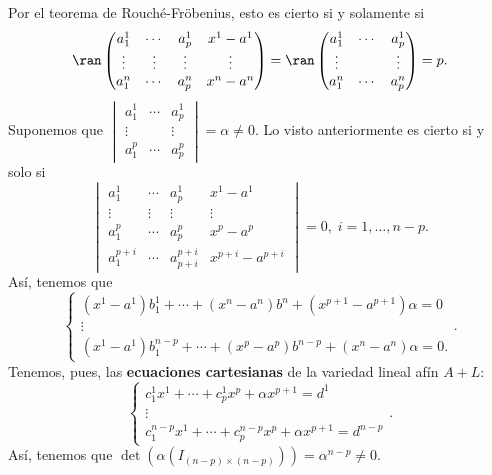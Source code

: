 Por el teorema de Rouché-Fröbenius, esto es cierto si y solamente si
\[ \ran\begin{pmatrix} a^{1}_{1} & \cdots & a^{1}_{p} & x^{1}-a^{1} \\
\vdots & \vdots & \vdots & \vdots \\
a^{n}_{1} & \cdots & a^{n}_{p} & x^{n}-a^{n}\end{pmatrix} = \ran\begin{pmatrix} a^{1}_{1} & \cdots & a^{1}_{p} \\
\vdots & & \vdots \\
a^{n}_{1} & \cdots & a^{n}_{p}\end{pmatrix} = p.\]
	Suponemos que $\displaystyle \begin{vmatrix} a^{1}_{1} & \cdots & a^{1}_{p} \\
	\vdots & & \vdots \\
a^{p}_{1} & \cdots & a^{p}_{p}\end{vmatrix} = \alpha \neq 0 $. Lo visto anteriormente es cierto si y solo si 
		\[ \begin{vmatrix} a^{1}_{1} & \cdots & a^{1}_{p} & x^{1}-a^{1} \\
		\vdots & \vdots & \vdots & \vdots \\
	a^{p}_{1} & \cdots & a^{p}_{p} & x^{p}-a^{p} \\
a^{p + i}_{1} & \cdots & a^{ p + i}_{ p + i} & x^{ p + i}- a^{p + i}\end{vmatrix}  = 0 , \; i = 1, \ldots, n - p.\]
Así, tenemos que 
\[
\begin{cases}
 \left(x^{1}-a^{1}\right)b^{1}_{1} + \cdots + \left(x^{n}-a^{n}\right)b^{n} +\left(x^{p + 1}-a^{p + 1}\right)\alpha = 0 \\
 \vdots \\
 \left(x^{1}-a^{1}\right)b^{n-p}_{1} + \cdots + \left(x^{p}-a^{p}\right)b^{n-p} + \left(x^{n}-a^{n}\right)\alpha = 0.
\end{cases}
.\]
Tenemos, pues, las \textbf{ecuaciones cartesianas} de la variedad lineal afín $\displaystyle A + L $: 
\[
\begin{cases}
c^{1}_{1}x^{1} + \cdots + c^{1}_{p}x^{p} + \alpha x^{p + 1} = d^{1} \\
\vdots \\
c^{n - p}_{1}x^{1} + \cdots + c^{n-p}_{p}x^{p} + \alpha x^{p + 1} = d^{n - p} 
\end{cases}
.\]
Así, tenemos que $\displaystyle \det\left(\alpha\left(I_{\left(n-p\right)\times\left(n-p\right)}\right)\right) = \alpha^{n-p} \neq 0 $. 
